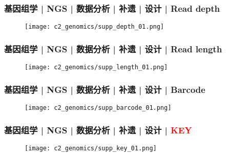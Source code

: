 \begin{frame}
  \frametitle{基因组学 | NGS | 数据分析 | 补遗 | 设计 | Read depth}
  \begin{figure}
    \centering
    \texttt{[image: c2\_genomics/supp\_depth\_01.png]}
  \end{figure}
\end{frame}

\begin{frame}
  \frametitle{基因组学 | NGS | 数据分析 | 补遗 | 设计 | Read length}
  \begin{figure}
    \centering
    \texttt{[image: c2\_genomics/supp\_length\_01.png]}
  \end{figure}
\end{frame}

\begin{frame}
  \frametitle{基因组学 | NGS | 数据分析 | 补遗 | 设计 | Barcode}
  \begin{figure}
    \centering
    \texttt{[image: c2\_genomics/supp\_barcode\_01.png]}
  \end{figure}
\end{frame}

\begin{frame}
  \frametitle{基因组学 | NGS | 数据分析 | 补遗 | 设计 | \textcolor{red}{KEY}}
  \begin{figure}
    \centering
    \texttt{[image: c2\_genomics/supp\_key\_01.png]}
  \end{figure}
\end{frame}

